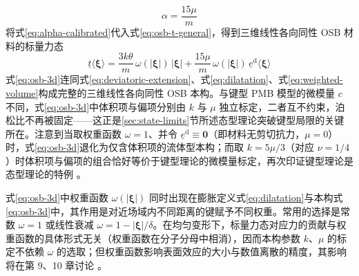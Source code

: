 \begin{equation}
  \alpha=\frac{15\mu}{m}
  \label{eq:alpha-calibrated}
\end{equation}
将式\eqref{eq:alpha-calibrated}代入式\eqref{eq:osb-t-general}，得到三维线性各向同性 OSB 材料的标量力态
\begin{equation}
  \underline{t}\langle\boldsymbol{\xi}\rangle=\frac{3k\theta}{m}\,\omega(|\boldsymbol{\xi}|)\,|\boldsymbol{\xi}|+\frac{15\mu}{m}\,\omega(|\boldsymbol{\xi}|)\,\underline{e}^{\mathrm{d}}\langle\boldsymbol{\xi}\rangle
  \label{eq:osb-3d}
\end{equation}
式\eqref{eq:osb-3d}连同式\eqref{eq:deviatoric-extension}、式\eqref{eq:dilatation}、式\eqref{eq:weighted-volume}构成完整的三维线性各向同性 OSB 本构。与键型 PMB 模型的微模量 $c$ 不同，式\eqref{eq:osb-3d}中体积项与偏项分别由 $k$ 与 $\mu$ 独立标定，二者互不约束，泊松比不再被固定——这正是\ref{sec:state-limits}节所述态型理论突破键型局限的关键所在。注意到当取权重函数 $\omega=1$、并令 $\underline{e}^{\mathrm{d}}\equiv\mathbf{0}$（即材料无剪切抗力，$\mu=0$）时，式\eqref{eq:osb-3d}退化为仅含体积项的流体型本构；而取 $k=5\mu/3$（对应 $\nu=1/4$）时体积项与偏项的组合恰好等价于键型理论的微模量标定，再次印证键型理论是态型理论的特例 \cite{Silling2007}。

\begin{remark}
  式\eqref{eq:osb-3d}中权重函数 $\omega(|\boldsymbol{\xi}|)$ 同时出现在膨胀定义式\eqref{eq:dilatation}与本构式\eqref{eq:osb-3d}中，其作用是对近场域内不同距离的键赋予不同权重。常用的选择是常数 $\omega=1$ 或线性衰减 $\omega=1-|\boldsymbol{\xi}|/\delta$。在均匀变形下，标量力态对应力的贡献与权重函数的具体形式无关（权重函数在分子分母中相消），因而本构参数 $k$、$\mu$ 的标定不依赖 $\omega$ 的选取；但权重函数影响表面效应的大小与数值离散的精度，其影响将在第 9、10 章讨论 \cite{Silling2007,LeBobaru2018Obj}。
\end{remark}

